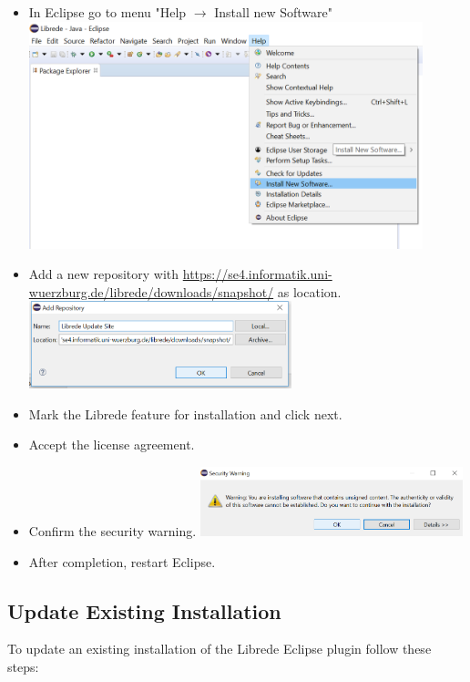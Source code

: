 \begin{itemize}
	\item In Eclipse go to menu "Help 	$ \rightarrow $ Install new Software" \newline
			\newline
			\includegraphics[width=0.9\textwidth]{screenshots/Screenshot3}
	
	\item Add a new repository with \url{https://se4.informatik.uni-wuerzburg.de/librede/downloads/snapshot/} as location.\newline
			\newline
			\includegraphics[width=0.6\textwidth]{screenshots/Screenshot5}
	\item Mark the Librede feature for installation and click next.
	\item Accept the license agreement.
	\item Confirm the security warning. \newline
			\newline
			\includegraphics[width=0.6\textwidth]{screenshots/Screenshot6}
	\item After completion, restart Eclipse.
	
\end{itemize}

\subsection{Update Existing Installation}
To update an existing installation of the Librede Eclipse plugin follow these steps:

